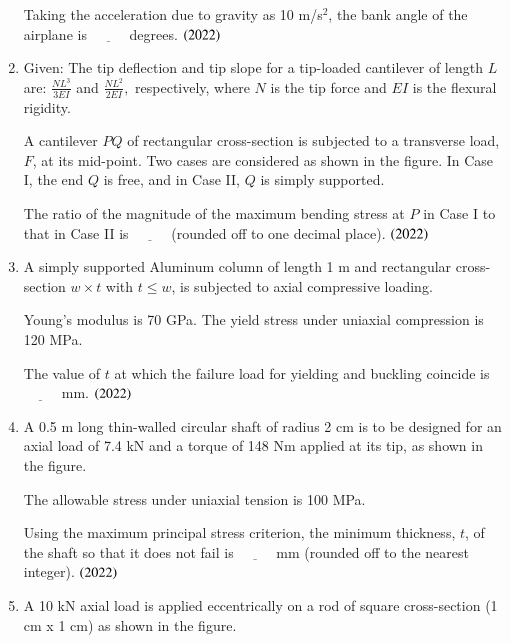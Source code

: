 \documentclass[journal,9pt,onecolumn]{IEEEtran}
\begin{document}
\begin{enumerate}
Taking the acceleration due to gravity as 10 m/s$^2$, the bank angle of the airplane is $\underline{\hspace{1cm}}$ degrees.
  \hfill $\left(2022\right)$
\item Given: The tip deflection and tip slope for a tip-loaded cantilever of length $L$ are: $\frac{NL^3}{3EI} $ and $\frac{NL^2}{2EI},$
    respectively, where $N$ is the tip force and $EI$ is the flexural rigidity.

    A cantilever $PQ$ of rectangular cross-section is subjected to a transverse load, $F$, at its mid-point. Two cases are considered as shown in the figure. In Case I, the end $Q$ is free, and in Case II, $Q$ is simply supported.

    The ratio of the magnitude of the maximum bending stress at $P$ in Case I to that in Case II is $\underline{\hspace{1cm}}$  (rounded off to one decimal place).    \hfill $\left(2022\right)$
\begin{multicols}{2}
    
    
\end{multicols}

\item A simply supported Aluminum column of length 1 m and rectangular cross-section $w \times t$ with $t \leq w$, is subjected to axial compressive loading.

    Young's modulus is 70 GPa. The yield stress under uniaxial compression is 120 MPa.

    The value of $t$ at which the failure load for yielding and buckling coincide is $\underline{\hspace{1cm}}$ mm.  \hfill $\left(2022\right)$

\item A 0.5 m long thin-walled circular shaft of radius 2 cm is to be designed for an axial load of 7.4 kN and a torque of 148 Nm applied at its tip, as shown in the figure.

The allowable stress under uniaxial tension is 100 MPa.

Using the maximum principal stress criterion, the minimum thickness, $t$, of the shaft so that it does not fail is $\underline{\hspace{1cm}}$ mm (rounded off to the nearest integer).    \hfill $\left(2022\right)$
\begin{center}
    
\end{center}
\item A 10 kN axial load is applied eccentrically on a rod of square cross-section (1 cm x 1 cm) as shown in the figure.


\end{enumerate}
\end{document}
